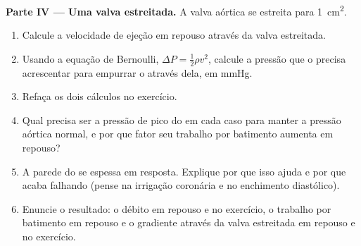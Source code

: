 \begin{problem}
\medskip
\noindent\textbf{Parte IV --- Uma valva estreitada.}
A valva aórtica se estreita para \qty{1}{cm^2}.
\begin{enumerate}[resume]
  \item Calcule a velocidade de ejeção em repouso através da valva
        estreitada.
  \item Usando a equação de Bernoulli, $\Delta P = \tfrac12\rho v^{2}$,
        calcule a pressão que o  precisa acrescentar para
        empurrar o  através dela, em mmHg.
  \item Refaça os dois cálculos no exercício.
  \item Qual precisa ser a pressão de pico do  em cada caso
        para manter a pressão aórtica normal, e por que fator seu
        trabalho por batimento aumenta em repouso?
  \item A parede do  se espessa em resposta. Explique por que
        isso ajuda e por que acaba falhando (pense na irrigação
        coronária e no enchimento diastólico).
  \item Enuncie o resultado: o débito em repouso e no exercício, o
        trabalho por batimento em repouso e o gradiente através da valva
        estreitada em repouso e no exercício.
\end{enumerate}
\end{problem}
